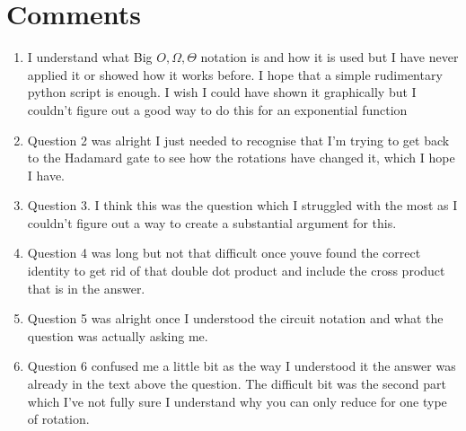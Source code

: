 \documentclass[12pt]{article}
\begin{document}
\section{Comments}
\begin{enumerate}
    \item I understand what Big $O, \Omega,\Theta$ notation is and how it is used but I have never applied it or showed how it works before. I hope that a simple rudimentary python script is enough. I wish I could have shown it graphically but I couldn't figure out a good way to do this for an exponential function
    \item Question 2 was alright I just needed to recognise that I'm trying to get back to the Hadamard gate to see how the rotations have changed it, which I hope I have. 
    \item Question 3. I think this was the question which I struggled with the most as I couldn't figure out a way to create a substantial argument for this. 
    \item Question 4 was long but not that difficult once youve found the correct identity to get rid of that double dot product and include the cross product that is in the answer. 
    \item Question 5 was alright once I understood the circuit notation and what the question was actually asking me. 
    \item Question 6 confused me a little bit as the way I understood it the answer was already in the text above the question. The difficult bit was the second part which I've not fully sure I understand why you can only reduce for one type of rotation. 
\end{enumerate}
\end{document}
